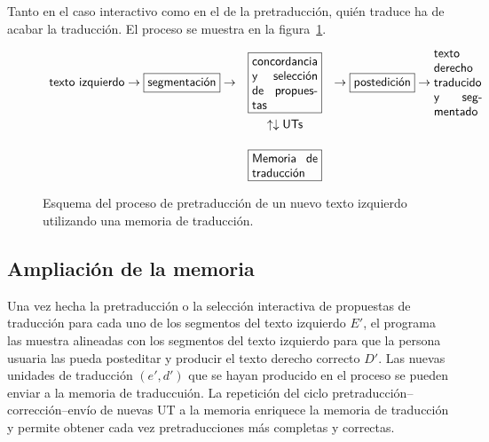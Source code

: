 Tanto en el caso interactivo como en el de la pretraducción, quién traduce ha de acabar la traducción. El proceso se muestra en la figura~\ref{fg:preMT}. \begin{figure} {\small $$ \begin{array}{rcl} \mbox{\textsf{texto izquierdo}} \to\mbox{\framebox{\textsf{segmentación}}} \to &\mbox{\framebox{\parbox{1.9cm}{\textsf{concordancia y selección de propuestas}}}} &\to \mbox{\framebox{\textsf{postedición}}} \to \mbox{\parbox{1.4cm}{\textsf{texto derecho traducido y segmentado}}} \\[0.8cm] &\uparrow \downarrow \mbox{\textsf{UTs}}& \\[0.5cm] &\mbox{\framebox{\parbox{1.9cm}{\textsf{Memoria de traducción}}}} &\\ \end{array} $$ } \caption{Esquema del proceso de pretraducción de un nuevo texto izquierdo utilizando una memoria de traducción.} \label{fg:preMT} \end{figure} 

\subsection{Ampliación de la memoria} 

Una vez hecha la pretraducción o la selección interactiva de propuestas de traducción para cada uno de los segmentos del texto izquierdo $E'$, el programa las muestra alineadas con los segmentos del texto izquierdo para que la persona usuaria las pueda posteditar y producir el texto derecho correcto $D'$. Las nuevas unidades de traducción $(e',d')$ que se hayan producido en el proceso se pueden enviar a la memoria de traduccuión. La repetición del ciclo pretraducción--corrección--envío de nuevas UT a la memoria enriquece la memoria de traducción y permite obtener cada vez pretraducciones más completas y correctas. 

